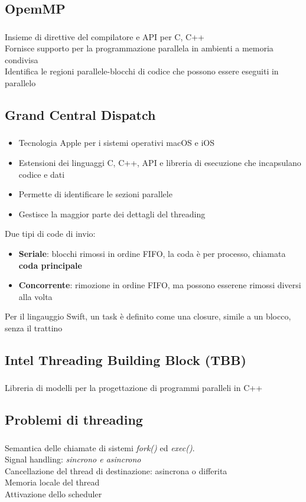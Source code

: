 \documentclass{beamer}
\newenvironment{mainframe}{
	\begin{frame}
		\frametitle{\insertsubsection}
		\framesubtitle{\insertsection}
	}{
	\end{frame}
}
\begin{document}
\subsection{OpemMP}
\begin{mainframe}
	Insieme di direttive del compilatore e API per C, C++\\
	Fornisce supporto per la programmazione parallela in ambienti a memoria condivisa\\
	Identifica le regioni parallele-blocchi di codice che possono essere eseguiti in parallelo
\end{mainframe}
\subsection{Grand Central Dispatch}
\begin{mainframe}
	\begin{itemize}
		\item Tecnologia Apple per i sistemi operativi macOS e iOS
		\item Estensioni dei linguaggi C, C++, API e libreria di esecuzione che incapsulano codice e dati
		\item Permette di identificare le sezioni parallele
		\item Gestisce la maggior parte dei dettagli del threading
	\end{itemize}
	Due tipi di code di invio:
	\begin{itemize}
		\item \textbf{Seriale}: blocchi rimossi in ordine FIFO, la coda è per processo, chiamata \textbf{coda principale}
		\item \textbf{Concorrente}: rimozione in ordine FIFO, ma possono esserene rimossi diversi alla volta
	\end{itemize}
	Per il lingauggio Swift, un task è definito come una closure, simile a un blocco, senza il trattino
\end{mainframe}
\subsection{Intel Threading Building Block (TBB)}
\begin{mainframe}
	Libreria di modelli per la progettazione di programmi paralleli in C++
\end{mainframe}
\subsection{Problemi di threading}
\begin{mainframe}
	Semantica delle chiamate di sistemi \textit{fork()} ed \textit{exec()}.\\
	Signal handling: \textit{sincrono e asincrono}\\
	Cancellazione del thread di destinazione: asincrona o differita\\
	Memoria locale del thread\\
	Attivazione dello scheduler
\end{mainframe}
\end{document}
